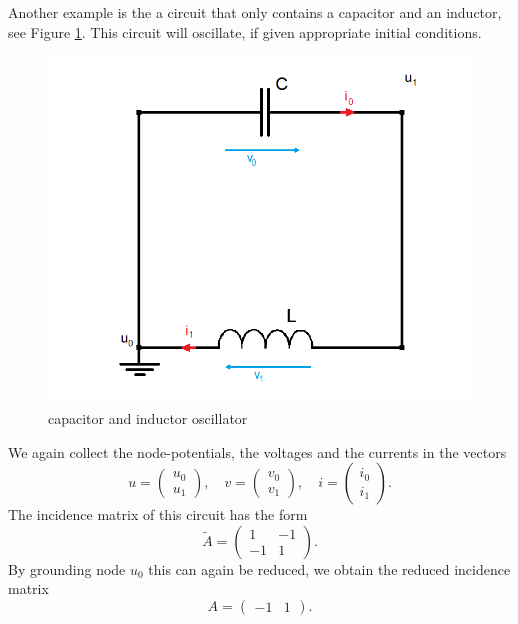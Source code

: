 \begin{example}
	\label{ex:LC-circuit incidence matrix}
	Another example is the a circuit that only contains a capacitor and an inductor, see Figure \ref{circuit:LC-circuit}. This circuit will oscillate, if given appropriate initial conditions.
	\begin{figure}[H]
		\centering
		\includegraphics[scale=0.5]{pictures/Example2_index0.png}
		\caption{capacitor and inductor oscillator}
		\label{circuit:LC-circuit}
	\end{figure}
	
	We again collect the node-potentials, the voltages and the currents in the vectors
	\begin{displaymath}
		u=
		\left(
		\begin{matrix}
			u_0 \\
			u_1
		\end{matrix}
		\right),
		\quad
		v=
		\left(
		\begin{matrix}
			v_0 \\
			v_1
		\end{matrix}
		\right),
		\quad
		i=
		\left(
		\begin{matrix}
			i_0 \\
			i_1
		\end{matrix}
		\right).
	\end{displaymath}
	The incidence matrix of this circuit has the form
	\begin{displaymath}
		\tilde{A} = 
		\left(
		\begin{matrix}
			1 & -1  \\
			-1 & 1 
		\end{matrix}
		\right).
	\end{displaymath}
	By grounding node $u_0$ this can again be reduced, we obtain the reduced incidence matrix
	\begin{displaymath}
		A = 
		\left(
		\begin{matrix}
			-1 & 1  
		\end{matrix}
		\right).
	\end{displaymath}
\end{example}

